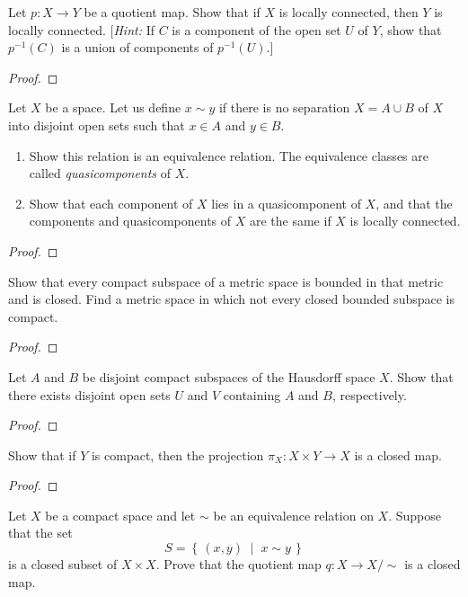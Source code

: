 \begin{problem}[Munkres \S25, Ex.\,8]
Let $p\colon X\to Y$ be a quotient map. Show that if $X$ is
locally connected, then $Y$ is locally connected. [\emph{Hint:}
If $C$ is a component of the open set $U$ of $Y$, show that
$p^{-1}(C)$ is a union of components of $p^{-1}(U)$.]
\end{problem}
\begin{proof}
\end{proof}
\newpage
\begin{problem}[Munkres \S25, Ex.\,10(a,b)]
Let $X$ be a space. Let us define $x\sim y$ if there is no
separation $X=A\cup B$ of $X$ into disjoint open sets such that
$x\in A$ and $y\in B$.
\begin{enumerate}[noitemsep,label=(\alph*)]
\item Show this relation is an equivalence relation. The
  equivalence classes are called \emph{quasicomponents} of $X$.
\item Show that each component of $X$ lies in a quasicomponent of
  $X$, and that the components and quasicomponents of $X$ are the
  same if $X$ is locally connected.
\end{enumerate}
\end{problem}
\begin{proof}
\end{proof}
\newpage
\begin{problem}[Munkres \S26, Ex.\,4]
Show that every compact subspace of a metric space is bounded in
that metric and is closed. Find a metric space in which not every
closed bounded subspace is compact.
\end{problem}
\begin{proof}
\end{proof}
\newpage
\begin{problem}[Munkres \S26, Ex.\,5]
Let $A$ and $B$ be disjoint compact subspaces of the Hausdorff
space $X$. Show that there exists disjoint open sets $U$ and $V$
containing $A$ and $B$, respectively.
\end{problem}
\begin{proof}
\end{proof}
\newpage
\begin{problem}[Munkres \S26, Ex.\,7]
Show that if $Y$ is compact, then the projection $\pi_X\colon
X\times Y\to X$ is a closed map.
\end{problem}
\begin{proof}
\end{proof}
\newpage
\begin{problem}[A]
Let $X$ be a compact space and let $\sim$ be an equivalence
relation on $X$. Suppose that the set
\[
S=\left\{\,(x,y)\;\middle|\;x\sim y\,\right\}
\]
is a closed subset of $X\times X$. Prove that the quotient map
$q\colon X\to X/{\sim}$ is a closed map.
\end{problem}
